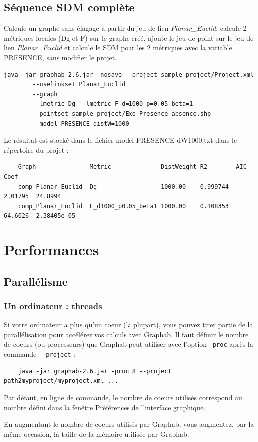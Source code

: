 \documentclass[a4paper,10pt]{report}
\begin{document}
\section{Séquence SDM complète}
Calcule un graphe sans élagage à partir du jeu de lien \textit{Planar\_Euclid}, calcule 2 métriques locales (Dg et F) sur le graphe créé, ajoute le jeu de point 
sur le jeu de lien \textit{Planar\_Euclid} et calcule le SDM pour les 2 métriques avec la variable PRESENCE, sans modifier le projet.
\begin{Verbatim}[tabsize=4]
	java -jar graphab-2.6.jar -nosave --project sample_project/Project.xml 
		--uselinkset Planar_Euclid 
		--graph 
		--lmetric Dg --lmetric F d=1000 p=0.05 beta=1 
		--pointset sample_project/Exo-Presence_absence.shp 
		--model PRESENCE distW=1000
\end{Verbatim}
Le résultat est stocké dans le fichier model-PRESENCE-dW1000.txt dans le répertoire du projet :
\begin{Verbatim}
	Graph               Metric              DistWeight R2        AIC      Coef
	comp_Planar_Euclid  Dg                  1000.00    0.999744  2.01795  24.8994
	comp_Planar_Euclid  F_d1000_p0.05_beta1 1000.00    0.108353  64.6026  2.38405e-05
\end{Verbatim}

\chapter{Performances}
\label{perf}
\section{Parallélisme}
\subsection{Un ordinateur : threads}
Si votre ordinateur a plus qu'un coeur (la plupart), vous pouvez tirer partie de la parallélisation pour accélérer vos calculs avec Graphab.
Il faut définir le nombre de coeurs (ou processeurs) que Graphab peut utiliser avec l'option \verb|-proc| après la commande \verb|--project| :
\begin{Verbatim}
	java -jar graphab-2.6.jar -proc 8 --project path2myproject/myproject.xml ...
\end{Verbatim}
Par défaut, en ligne de commande, le nombre de coeurs utilisés correspond au nombre défini dans la fenêtre Préférences de l'interface graphique.

En augmentant le nombre de coeurs utilisés par Graphab, vous augmentez, par la même occasion, la taille de la mémoire utilisée par Graphab.
\end{document}
